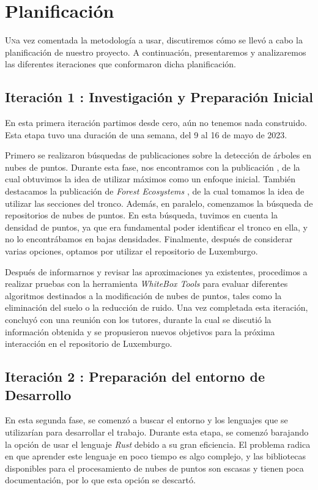 \chapter{Planificación}
\label{chap:planification}

\lettrine{U}{n}a vez comentada la metodología a usar, discutiremos cómo se llevó a cabo la planificación de nuestro proyecto. A continuación, presentaremos y analizaremos las diferentes iteraciones que conformaron dicha planificación.

\section{Iteración 1 : Investigación y Preparación Inicial}
\label{chap:investigPlan}

En esta primera iteración partimos desde cero, aún no tenemos nada construido. Esta etapa tuvo una duración de una semana, del 9 al 16 de mayo de 2023.

Primero se realizaron búsquedas de publicaciones sobre la detección de árboles en nubes de puntos. Durante esta fase, nos encontramos con la publicación \cite{rs15061619}, de la cual obtuvimos la idea de utilizar máximos como un enfoque inicial. También destacamos la publicación de \textit{Forest Ecosystems} \cite{ZHANG2023100088}, de la cual tomamos la idea de utilizar las secciones del tronco. Además, en paralelo, comenzamos la búsqueda de repositorios de nubes de puntos. En esta búsqueda, tuvimos en cuenta la densidad de puntos, ya que era fundamental poder identificar el tronco en ella, y no lo encontrábamos en bajas densidades. Finalmente, después de considerar varias opciones, optamos por utilizar el repositorio de Luxemburgo.


Después de informarnos y revisar las aproximaciones ya existentes, procedimos a realizar pruebas con la herramienta \textit{WhiteBox Tools} para evaluar diferentes algoritmos destinados a la modificación de nubes de puntos, tales como la eliminación del suelo o la reducción de ruido. Una vez completada esta iteración, concluyó con una reunión con los tutores, durante la cual se discutió la información obtenida y se propusieron nuevos objetivos para la próxima interacción en el repositorio de Luxemburgo.

\section{Iteración 2 : Preparación del entorno de Desarrollo}
En esta segunda fase, se comenzó a buscar el entorno y los lenguajes que se utilizarían para desarrollar el trabajo. Durante esta etapa, se comenzó barajando la opción de usar el lenguaje \textit{Rust} debido a su gran eficiencia. El problema radica en que aprender este lenguaje en poco tiempo es algo complejo, y las bibliotecas disponibles para el procesamiento de nubes de puntos son escasas y tienen poca documentación, por lo que esta opción se descartó.


